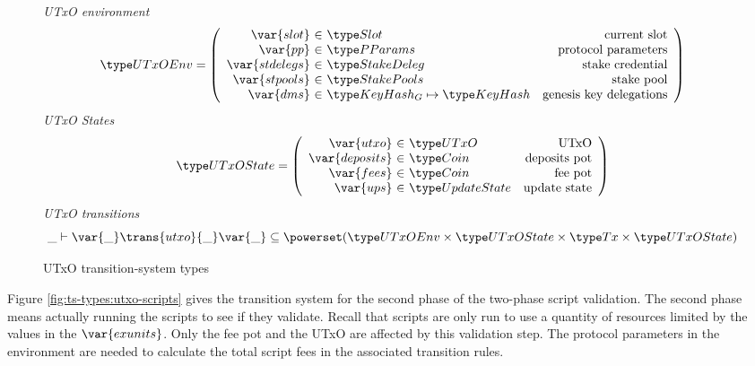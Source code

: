 \begin{figure}[htb]
  \emph{UTxO environment}
  \begin{equation*}
    \UTxOEnv =
    \left(
      \begin{array}{r@{~\in~}lr}
        \var{slot} & \Slot & \text{current slot}\\
        \var{pp} & \PParams & \text{protocol parameters}\\
        \var{stdelegs} & \StakeDeleg & \text{stake credential}\\
        \var{stpools} & \StakePools & \text{stake pool}\\
        \var{dms} & \KeyHashGen\mapsto\KeyHash & \text{genesis key delegations} \\
      \end{array}
    \right)
  \end{equation*}
  \emph{UTxO States}
  \begin{equation*}
    \UTxOState =
    \left(
      \begin{array}{r@{~\in~}lr}
        \var{utxo} & \UTxO & \text{UTxO}\\
        \var{deposits} & \Coin & \text{deposits pot}\\
        \var{fees} & \Coin & \text{fee pot}\\
        \var{ups} & \UpdateState & \text{update state}\\
      \end{array}
    \right)
  \end{equation*}
  \emph{UTxO transitions}
  \begin{equation*}
    \_ \vdash
    \var{\_} \trans{utxo}{\_} \var{\_}
    \subseteq \powerset (\UTxOEnv \times \UTxOState \times \Tx \times \UTxOState)
  \end{equation*}
  \caption{UTxO transition-system types}
  \label{fig:ts-types:utxo-shelley}
\end{figure}

Figure \ref{fig:ts-types:utxo-scripts} gives the transition system for the second phase of
the two-phase script validation. The second phase means actually running
the scripts to see if they validate. Recall that scripts are only run to use a quantity of
resources limited by the values in the $\var{exunits}$. Only the fee pot and the
UTxO are affected by this validation step. The protocol parameters in the
environment are needed to calculate the total script fees in the associated
transition rules.

